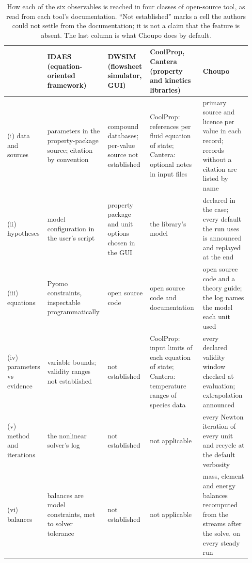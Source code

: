 \documentclass[preprint,12pt]{elsarticle}
\begin{document}
\begin{table}[t]
\centering\scriptsize
\caption{How each of the six observables is reached in four classes of
open-source tool, as read from each tool's documentation.  ``Not
established'' marks a cell the authors could not settle from the
documentation; it is not a claim that the feature is absent.  The last
column is what Choupo does by default.}
\label{tab:sota}
\renewcommand{\arraystretch}{1.12}
\begin{tabularx}{\linewidth}{>{\raggedright\arraybackslash}p{2.1cm}
                             >{\raggedright\arraybackslash}X
                             >{\raggedright\arraybackslash}X
                             >{\raggedright\arraybackslash}X
                             >{\raggedright\arraybackslash}X}
\toprule
& \textbf{IDAES} (equation-oriented framework) & \textbf{DWSIM}
  (flowsheet simulator, GUI) & \textbf{CoolProp, Cantera} (property and
  kinetics libraries) & \textbf{Choupo} \\
\midrule
(i) data and sources & parameters in the property-package source;
  citation by convention & compound databases; per-value source not
  established & CoolProp: references per fluid equation of state;
  Cantera: optional notes in input files & primary source and licence per
  value in each record; records without a citation are listed by name \\
(ii) hypotheses & model configuration in the user's script & property
  package and unit options chosen in the GUI & the library's model &
  declared in the case; every default the run uses is announced and
  replayed at the end \\
(iii) equations & Pyomo constraints, inspectable programmatically & open
  source code & open source code and documentation & open source code and
  a theory guide; the log names the model each unit used \\
(iv) parameters vs evidence & variable bounds; validity ranges not
  established & not established & CoolProp: input limits of each equation
  of state; Cantera: temperature ranges of species data & every declared
  validity window checked at evaluation; extrapolation announced \\
(v) method and iterations & the nonlinear solver's log & not established
  & not applicable & every Newton iteration of every unit and recycle at
  the default verbosity \\
(vi) balances & balances are model constraints, met to solver tolerance &
  not established & not applicable & mass, element and energy balances
  recomputed from the streams after the solve, on every steady run \\
\bottomrule
\end{tabularx}
\end{table}
\end{document}
